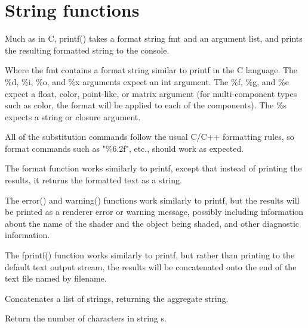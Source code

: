 \documentclass[11pt,letterpaper]{book}
\def\color{{\cf color}\xspace}
\def\float{{\cf float}\xspace}
\def\matrix{{\cf matrix}\xspace}
\begin{document}
\section{String functions}
\label{sec:stdlib:string}


Much as in C, {\cf printf()} takes a format string {\cf fmt} and an
argument list, and prints the resulting formatted string to the console.

Where the {\cf fmt} contains a format string similar to {\cf printf} in
the C language. The {\cf \%d}, {\cf \%i}, {\cf \%o}, and {\cf \%x}
arguments expect an {\cf int} argument.  The {\cf \%f}, {\cf \%g}, and
{\cf \%e} expect a \float, \color, point-like, or \matrix argument (for
multi-component types such as \color, the format will be applied to each
of the components).  The {\cf \%s} expects a {\cf string} or 
{\cf closure} argument.

All of the substitution commands follow the usual C/C++ formatting rules,
so format commands such as {\cf "\%6.2f"}, etc., should work as
expected.
\apiend

The {\cf format} function works similarly to {\cf printf}, except that
instead of printing the results, it returns the formatted text as a
{\cf string}.
\apiend

 
The {\cf error()} and {\cf warning()} functions work similarly to {\cf printf}, but the
results will be printed as a renderer error or warning message, possibly including
information about the name of the shader and the object being shaded,
and other diagnostic information.
\apiend

The {\cf fprintf()} function works similarly to {\cf printf}, but rather
than printing to the default text output stream, the results will be
concatenated onto the end of the text file named by {\cf filename}.
\apiend

Concatenates a list of strings, returning the aggregate string.
\apiend

Return the number of characters in string {\ce s}.
\apiend
\end{document}
